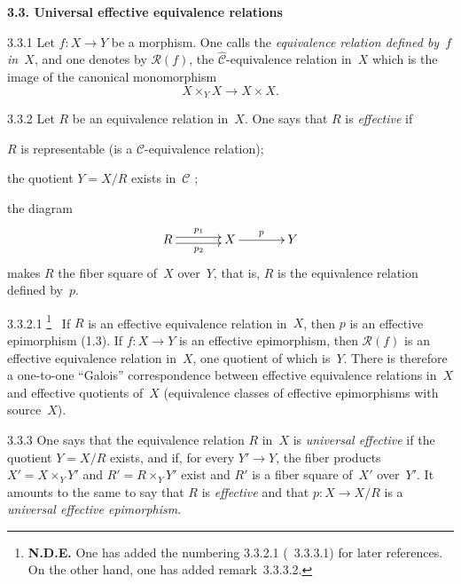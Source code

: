 \par{}
\noindent\textbf{3.3. Universal effective equivalence relations}\label{IV.sec.3.3}
\par{}

\begin{definition}{3.3.1}
\label{IV.3.3.1}
Let \(f\colon X\to Y\) be a morphism. One calls the \emph{equivalence relation
defined by~\(f\) in~\(X\)}, and one denotes by \(\mathcal{R}(f)\), the
\(\widehat{\mathcal{C}}\)-equivalence relation in~\(X\) which is the image of
the canonical monomorphism
\[
X\times_{Y}X\longrightarrow X\times X.
\]
\end{definition}

\begin{definition}{3.3.2}
\label{IV.3.3.2}
Let \(R\) be an equivalence relation in~\(X\). One says that \(R\) is
\emph{effective} if
\begin{enumeratei}
\item \(R\) is representable (\ie is a \(\mathcal{C}\)-equivalence relation);
\item the quotient \(Y=X/R\) exists in~\(\mathcal{C}\)%
{\renewcommand{\thefootnote}{(13)}};
\item the diagram
\[
\xymatrix@C=3.6em{
R \ar@<0.55ex>[r]^{p_{1}} \ar@<-0.55ex>[r]_{p_{2}}
  & X \ar[r]^{p}
  & Y
}
\]
makes \(R\) the fiber square of~\(X\) over~\(Y\), that is, \(R\) is the
equivalence relation defined by~\(p\).
\end{enumeratei}
\end{definition}

\begin{scholium}{3.3.2.1}
\label{IV.3.3.2.1}
{\renewcommand{\thefootnote}{(14)}\footnote{\normalfont\textbf{N.D.E.}
One has added the numbering 3.3.2.1 (\resp~3.3.3.1) for later references.
On the other hand, one has added remark~3.3.3.2.}}%
\ If \(R\) is an effective equivalence relation in~\(X\), then \(p\) is an
effective epimorphism (1.3). If \(f\colon X\to Y\) is an effective
epimorphism, then \(\mathcal{R}(f)\) is an effective equivalence relation
in~\(X\), one quotient of which is~\(Y\). There is therefore a one-to-one
``Galois'' correspondence between effective equivalence relations in~\(X\)
and effective quotients of~\(X\) (\ie equivalence classes of effective
epimorphisms with source~\(X\)).
\end{scholium}

\begin{definition}{3.3.3}
\label{IV.3.3.3}
One says that the equivalence relation \(R\) in~\(X\) is \emph{universal
effective} if the quotient \(Y=X/R\) exists, and if, for every \(Y'\to Y\),
the fiber products \(X'=X\times_{Y}Y'\) and \(R'=R\times_{Y}Y'\) exist and
\(R'\) is a fiber square of~\(X'\) over~\(Y'\). It amounts to the same to say
that \(R\) is \emph{effective} and that \(p\colon X\to X/R\) is a
\emph{universal effective epimorphism}.
\end{definition}

